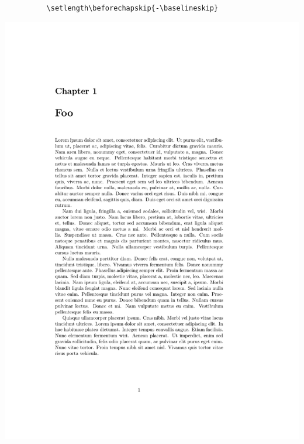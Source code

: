 \documentclass{beamer}
\begin{document}
\begin{frame}[fragile]
\begin{overprint}
\begin{columns}
      \begin{column}{0.5\textwidth}
        \begin{verbatim}
          \setlength\beforechapskip{-\baselineskip}
        \end{verbatim}
        \begin{center}
          \includegraphics[frame,page=1,width=0.8\linewidth]{examples/chapterheadstart-2}
        \end{center}
      \end{column}
    \end{columns}


\end{overprint}
\end{frame}
\end{document}
